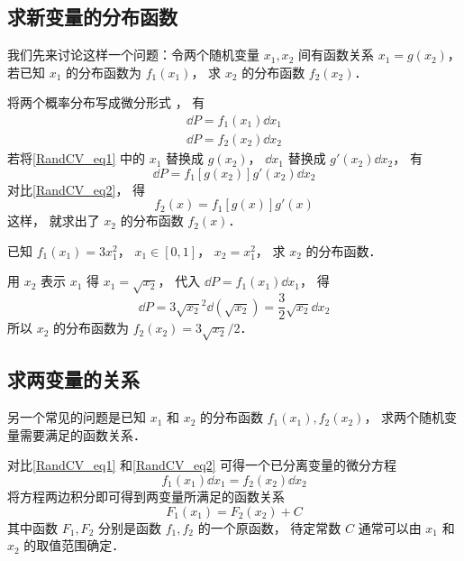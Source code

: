 

\subsection{求新变量的分布函数}

我们先来讨论这样一个问题：令两个随机变量 $x_1, x_2$ 间有函数关系 $x_1 = g(x_2)$， 若已知 $x_1$ 的分布函数为 $f_1(x_1)$， 求 $x_2$ 的分布函数 $f_2(x_2)$．

将两个概率分布写成微分形式%
， 有
\begin{gather}
\dd{P} = f_1(x_1) \dd{x_1}\label{RandCV_eq1}\\
\dd{P} = f_2(x_2) \dd{x_2} \label{RandCV_eq2}
\end{gather}
若将\autoref{RandCV_eq1} 中的 $x_1$ 替换成 $g(x_2)$， $\dd{x_1}$ 替换成 $g'(x_2)\dd{x_2}$， 有
\begin{equation}
\dd{P} = f_1[g(x_2)] g'(x_2) \dd{x_2}
\end{equation}
对比\autoref{RandCV_eq2}， 得
\begin{equation}
f_2(x) = f_1[g(x)] g'(x)
\end{equation}
这样， 就求出了 $x_2$ 的分布函数 $f_2(x)$．

\begin{example}{}
已知 $f_1(x_1) = 3x_1^2$， $x_1 \in [0, 1]$， $x_2 = x_1^2$， 求 $x_2$ 的分布函数．

用 $x_2$ 表示 $x_1$ 得 $x_1 = \sqrt{x_2}$， 代入 $\dd{P} = f_1(x_1)\dd{x_1}$， 得
\begin{equation}
\dd{P} = 3\sqrt{x_2}^2 \dd(\sqrt{x_2}) = \frac32 \sqrt{x_2} \dd{x_2}
\end{equation}
所以 $x_2$ 的分布函数为 $f_2(x_2) = 3\sqrt{x_2}/2$．
\end{example}

\subsection{求两变量的关系}

另一个常见的问题是已知 $x_1$ 和 $x_2$ 的分布函数 $f_1(x_1), f_2(x_2)$， 求两个随机变量需要满足的函数关系．

对比\autoref{RandCV_eq1} 和\autoref{RandCV_eq2} 可得一个已分离变量的微分方程
\begin{equation}\label{RandCV_eq6}
f_1(x_1)\dd{x_1} = f_2(x_2)\dd{x_2}
\end{equation}
将方程两边积分即可得到两变量所满足的函数关系
\begin{equation}
F_1(x_1) = F_2(x_2) + C
\end{equation}
其中函数 $F_1, F_2$ 分别是函数 $f_1, f_2$ 的一个原函数， 待定常数 $C$ 通常可以由 $x_1$ 和 $x_2$ 的取值范围确定．

